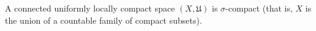 A connected uniformly locally compact space $(X, \mathfrak{U})$ is $\sigma$-compact (that is, $X$ is the union of a countable family of compact subsets).
